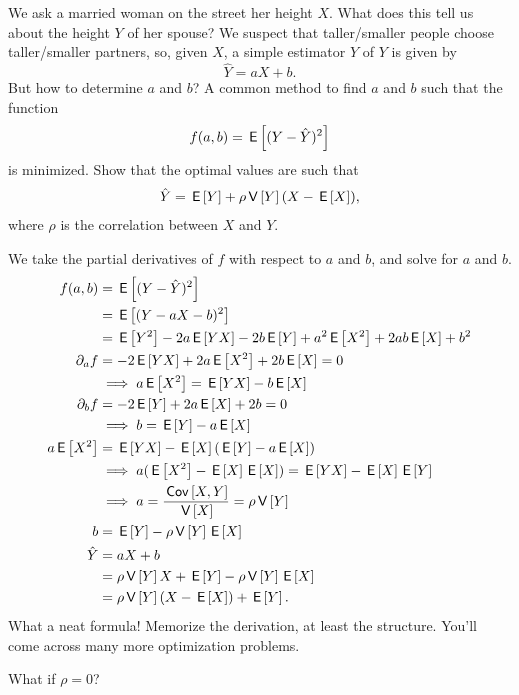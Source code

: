 \begin{exercise}
We ask a married woman on the street her height $X$. What does this tell us about the height $Y$ of her spouse? We suspect that taller/smaller people choose  taller/smaller partners, so, given $X$, a simple estimator $\hat Y$ of $Y$ is given by
\begin{equation*}
  \hat Y = a X + b.
\end{equation*}
But how to determine $a$ and $b$? A common method to find $a$ and $b$ such that the function
\begin{equation*}
  f(a,b) = \E{(Y-\hat Y)^2}
\end{equation*}
is minimized. Show that the optimal values are such that
\begin{align*}
  \hat Y = \E Y + \rho \V Y (X - \E X),
\end{align*}
where $\rho$ is the correlation between $X$ and $Y$.

\begin{solution}
We take the partial derivatives of $f$ with respect to $a$ and $b$, and solve for $a$ and $b$.
  \begin{align*}
f(a,b) &= \E{(Y-\hat Y)^2} \\
 &= \E{(Y-a X - b)^2} \\
 &= \E{Y^{2}} - 2a\E{YX} - 2b\E Y + a^{2}\E{X^2} + 2 ab \E X + b^{2}\\
\partial_{a} f &=-2 \E{YX} + 2a \E{X^2} + 2 b \E X = 0 \\
&\implies a \E{X^2} =  \E{YX}  -  b \E X \\
\partial_{b} f &=-2 \E{Y}  + 2 a \E X  + 2 b= 0 \\
& \implies  b = \E Y - a \E{X}\\
a \E{X^2} &=  \E{YX}  -  \E X (\E Y - a \E X) \\
&\implies  a (\E{X^{2}} - \E X \E X)  = \E{YX} - \E X \E Y  \\
&\implies a = \frac{\cov{X,Y}}{\V X} = \rho \V Y\\
b &= \E Y - \rho \V Y \E X\\
\hat Y &= a X + b \\
&= \rho \V Y X + \E Y - \rho \V Y \E X \\
&= \rho \V Y (X-\E X)  + \E Y.
  \end{align*}
What a neat formula! Memorize the derivation, at least the structure. You'll come across many more optimization problems.

What if $\rho=0$?
\end{solution}
\end{exercise}


